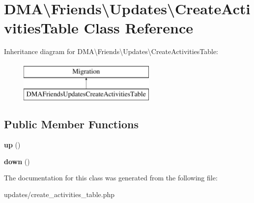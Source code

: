 \hypertarget{classDMA_1_1Friends_1_1Updates_1_1CreateActivitiesTable}{\section{D\-M\-A\textbackslash{}Friends\textbackslash{}Updates\textbackslash{}Create\-Activities\-Table Class Reference}
\label{classDMA_1_1Friends_1_1Updates_1_1CreateActivitiesTable}
}
Inheritance diagram for D\-M\-A\textbackslash{}Friends\textbackslash{}Updates\textbackslash{}Create\-Activities\-Table\-:\begin{figure}[H]
\begin{center}
\leavevmode
\includegraphics[height=2.000000cm]{d5/dd6/classDMA_1_1Friends_1_1Updates_1_1CreateActivitiesTable}
\end{center}
\end{figure}
\subsection*{Public Member Functions}
\begin{DoxyCompactItemize}
\item 
\hypertarget{classDMA_1_1Friends_1_1Updates_1_1CreateActivitiesTable_a6b5e75fdb7abe32844095af94e7484ba}{{\bfseries up} ()}\label{classDMA_1_1Friends_1_1Updates_1_1CreateActivitiesTable_a6b5e75fdb7abe32844095af94e7484ba}

\item 
\hypertarget{classDMA_1_1Friends_1_1Updates_1_1CreateActivitiesTable_a5056e3abfe63182ddfbf679756e75f4f}{{\bfseries down} ()}\label{classDMA_1_1Friends_1_1Updates_1_1CreateActivitiesTable_a5056e3abfe63182ddfbf679756e75f4f}

\end{DoxyCompactItemize}


The documentation for this class was generated from the following file\-:\begin{DoxyCompactItemize}
\item 
updates/create\-\_\-activities\-\_\-table.\-php\end{DoxyCompactItemize}
